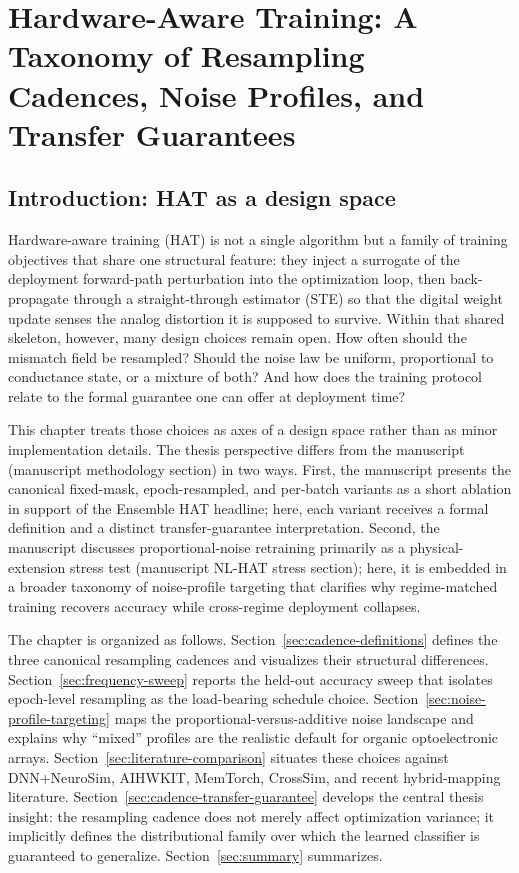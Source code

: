 \chapter{Hardware-Aware Training: A Taxonomy of Resampling Cadences, Noise Profiles, and Transfer Guarantees}
\label{chap:hat-taxonomy}

\section{Introduction: HAT as a design space}
\label{sec:hat-design-space}

Hardware-aware training (HAT) is not a single algorithm but a family of training objectives that share one structural feature: they inject a surrogate of the deployment forward-path perturbation into the optimization loop, then back-propagate through a straight-through estimator (STE) so that the digital weight update senses the analog distortion it is supposed to survive. Within that shared skeleton, however, many design choices remain open. How often should the mismatch field be resampled? Should the noise law be uniform, proportional to conductance state, or a mixture of both? And how does the training protocol relate to the formal guarantee one can offer at deployment time?

This chapter treats those choices as axes of a design space rather than as minor implementation details. The thesis perspective differs from the manuscript (manuscript methodology section) in two ways. First, the manuscript presents the canonical fixed-mask, epoch-resampled, and per-batch variants as a short ablation in support of the Ensemble HAT headline; here, each variant receives a formal definition and a distinct transfer-guarantee interpretation. Second, the manuscript discusses proportional-noise retraining primarily as a physical-extension stress test (manuscript NL-HAT stress section); here, it is embedded in a broader taxonomy of noise-profile targeting that clarifies why regime-matched training recovers accuracy while cross-regime deployment collapses.

The chapter is organized as follows. Section~\ref{sec:cadence-definitions} defines the three canonical resampling cadences and visualizes their structural differences. Section~\ref{sec:frequency-sweep} reports the held-out accuracy sweep that isolates epoch-level resampling as the load-bearing schedule choice. Section~\ref{sec:noise-profile-targeting} maps the proportional-versus-additive noise landscape and explains why ``mixed'' profiles are the realistic default for organic optoelectronic arrays. Section~\ref{sec:literature-comparison} situates these choices against DNN+NeuroSim, AIHWKIT, MemTorch, CrossSim, and recent hybrid-mapping literature. Section~\ref{sec:cadence-transfer-guarantee} develops the central thesis insight: the resampling cadence does not merely affect optimization variance; it implicitly defines the distributional family over which the learned classifier is guaranteed to generalize. Section~\ref{sec:summary} summarizes.

